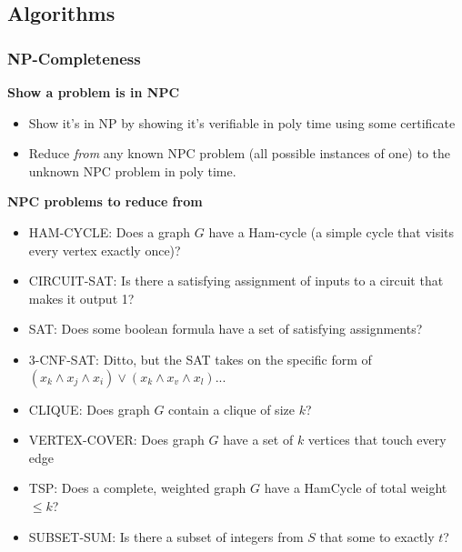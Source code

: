 \documentclass[7pt]{article}
\begin{document}
\begin{multicols*}{4}
\subsection*{Algorithms}
\subsubsection*{NP-Completeness}
{\bf Show a problem is in NPC}
\begin{itemize}
\item Show it's in NP by showing it's verifiable in poly time using
  some certificate
\item Reduce \emph{from} any known NPC problem (all possible instances
  of one) to the unknown NPC problem in poly time.
\end{itemize}

{\bf NPC problems to reduce from}
\begin{itemize}
\item HAM-CYCLE: Does a graph $G$ have a Ham-cycle (a simple cycle
  that visits every vertex exactly once)?
\item CIRCUIT-SAT: Is there a satisfying assignment of inputs to a
  circuit that makes it output 1?
\item SAT: Does some boolean formula have a set of satisfying assignments?
\item 3-CNF-SAT: Ditto, but the SAT takes on the specific form of
  $(x_k \wedge x_j \wedge x_i) \vee (x_k \wedge x_v \wedge x_l) ...$
\item CLIQUE: Does graph $G$ contain a clique of size $k$?
\item VERTEX-COVER: Does graph $G$ have a set of $k$ vertices that
  touch every edge
\item TSP: Does a complete, weighted graph $G$ have a HamCycle of
  total weight $\leq k$?
\item SUBSET-SUM: Is there a subset of integers from $S$ that some to
  exactly $t$? 
\end{itemize}


\end{multicols*}
\end{document}
